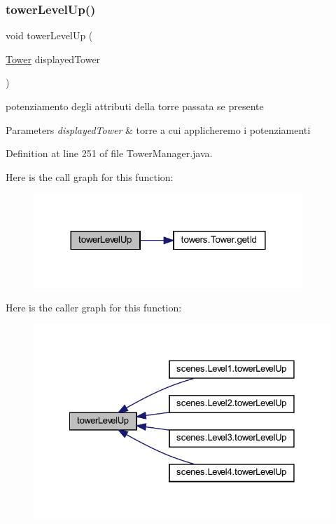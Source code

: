 \subsubsection{\texorpdfstring{tower\+Level\+Up()}{towerLevelUp()}}
{\footnotesize\ttfamily void tower\+Level\+Up (\begin{DoxyParamCaption}\item[{\hyperlink{classtowers_1_1_tower}{Tower}}]{displayed\+Tower }\end{DoxyParamCaption})}



potenziamento degli attributi della torre passata se presente 


\begin{DoxyParams}{Parameters}
{\em displayed\+Tower} & torre a cui applicheremo i potenziamenti \\
\hline
\end{DoxyParams}


Definition at line 251 of file Tower\+Manager.\+java.

Here is the call graph for this function\+:\nopagebreak
\begin{figure}[H]
\begin{center}
\leavevmode
\includegraphics[width=288pt]{classmanagers_1_1_tower_manager_a8a3c715fcfd3d65e1d8241a1fa4965ff_cgraph}
\end{center}
\end{figure}
Here is the caller graph for this function\+:\nopagebreak
\begin{figure}[H]
\begin{center}
\leavevmode
\includegraphics[width=328pt]{classmanagers_1_1_tower_manager_a8a3c715fcfd3d65e1d8241a1fa4965ff_icgraph}
\end{center}
\end{figure}
\mbox{\label{classmanagers_1_1_tower_manager_ac5c54df7ed3b930268c8d7752c101725}} 
